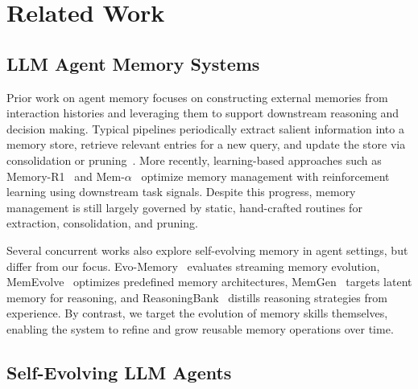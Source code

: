 \section{Related Work}



\subsection{LLM Agent Memory Systems}


Prior work on agent memory focuses on constructing external memories from interaction histories and leveraging them to support downstream reasoning and decision making. 
Typical pipelines periodically extract salient information into a memory store, retrieve relevant entries for a new query, and update the store via consolidation or pruning~\citep{kang2025memory, zhong2024memorybank, xu2025mem, packer2023memgpt, chhikara2025mem0, fang2025lightmem}. More recently, learning-based approaches such as Memory-R1~\citep{yan2025memory} and Mem-$\alpha$~\cite{wang2025mem} optimize memory management with reinforcement learning using downstream task signals. 
Despite this progress, memory management is still largely governed by static, hand-crafted routines for extraction, consolidation, and pruning.



Several concurrent works also explore self-evolving memory in agent settings, but differ from our focus. Evo-Memory~\citep{wei2025evo} evaluates streaming memory evolution, MemEvolve~\citep{zhang2025memevolve} optimizes predefined memory architectures, MemGen~\citep{zhang2025memgen} targets latent memory for reasoning, and ReasoningBank~\citep{ouyang2025reasoningbank} distills reasoning strategies from experience. 
By contrast, we target the evolution of memory skills themselves, enabling the system to refine and grow reusable memory operations over time.








\subsection{Self-Evolving LLM Agents}


